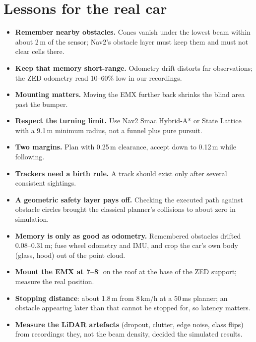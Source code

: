\documentclass[11pt,a4paper]{article}
\begin{document}
\section{Lessons for the real car}
\begin{itemize}[nosep]
  \item \textbf{Remember nearby obstacles.} Cones vanish under the lowest beam within about 2\,m of the
        sensor; Nav2's obstacle layer must keep them and must not clear cells there.
  \item \textbf{Keep that memory short-range.} Odometry drift distorts far observations; the ZED odometry
        read 10--60\% low in our recordings.
  \item \textbf{Mounting matters.} Moving the EMX further back shrinks the blind area past the bumper.
  \item \textbf{Respect the turning limit.} Use Nav2 Smac Hybrid-A* or State Lattice with a 9.1\,m minimum
        radius, not a funnel plus pure pursuit.
  \item \textbf{Two margins.} Plan with 0.25\,m clearance, accept down to 0.12\,m while following.
  \item \textbf{Trackers need a birth rule.} A track should exist only after several consistent sightings.
  \item \textbf{A geometric safety layer pays off.} Checking the executed path against obstacle circles brought the
        classical planner's collisions to about zero in simulation.
  \item \textbf{Memory is only as good as odometry.} Remembered obstacles drifted 0.08--0.31\,m; fuse wheel odometry
        and IMU, and crop the car's own body (glass, hood) out of the point cloud.
  \item \textbf{Mount the EMX at 7--8$^\circ$} on the roof at the base of the ZED support; measure the real position.
  \item \textbf{Stopping distance}: about 1.8\,m from 8\,km/h at a 50\,ms planner; an obstacle appearing later than
        that cannot be stopped for, so latency matters.
  \item \textbf{Measure the LiDAR artefacts} (dropout, clutter, edge noise, class flips) from recordings: they, not the
        beam density, decided the simulated results.
\end{itemize}

\end{document}
